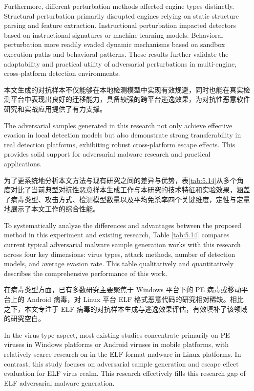Furthermore, different perturbation methods affected engine types distinctly. Structural perturbation primarily disrupted engines relying on static structure parsing and feature extraction. Instructional perturbation impacted detectors based on instructional signatures or machine learning models. Behavioral perturbation more readily evaded dynamic mechanisms based on sandbox execution paths and behavioral patterns. These results further validate the adaptability and practical utility of adversarial perturbations in multi-engine, cross-platform detection environments.

本文生成的对抗样本不仅能够在本地检测模型中实现有效规避，同时也能在真实检测平台中表现出良好的迁移能力，具备较强的跨平台逃逸效果，为对抗性恶意软件研究和实战应用提供了有力支撑。

The adversarial samples generated in this research not only achieve effective evasion in local detection models but also demonstrate strong transferability in real detection platforms, exhibiting robust cross-platform escape effects. This provides solid support for adversarial malware research and practical applications.

为了更系统地分析本文方法与现有研究之间的差异与优势，表\ref{tab:5.14}从多个角度对比了当前典型对抗性恶意样本生成工作与本研究的技术特征和实验效果，涵盖了病毒类型、攻击方式、检测模型数量以及平均免杀率四个关键维度，定性与定量地展示了本文工作的综合性能。

To systematically analyze the differences and advantages between the proposed method in this experiment and existing research, Table \ref{tab:5.14} compares current typical adversarial malware sample generation works with this research across four key dimensions: virus types, attack methods, number of detection models, and average evasion rate. This table qualitatively and quantitatively describes the comprehensive performance of this work.

在病毒类型方面，已有多数研究主要聚焦于 Windows 平台下的 PE 病毒或移动平台上的 Android 病毒，对 Linux 平台 ELF 格式恶意代码的研究相对稀缺。相比之下，本文专注于 ELF 病毒的对抗样本生成与逃逸效果评估，有效填补了该领域的研究空白。

In the virus type aspect, most existing studies concentrate primarily on PE viruses in Windows platforms or Android viruses in mobile platforms, with relatively scarce research on in the ELF format malware in Linux platforms. In contrast, this study focuses on adversarial sample generation and escape effect evaluation for ELF virus realm. This research effectively fills this research gap of ELF adversarial malware generation.

